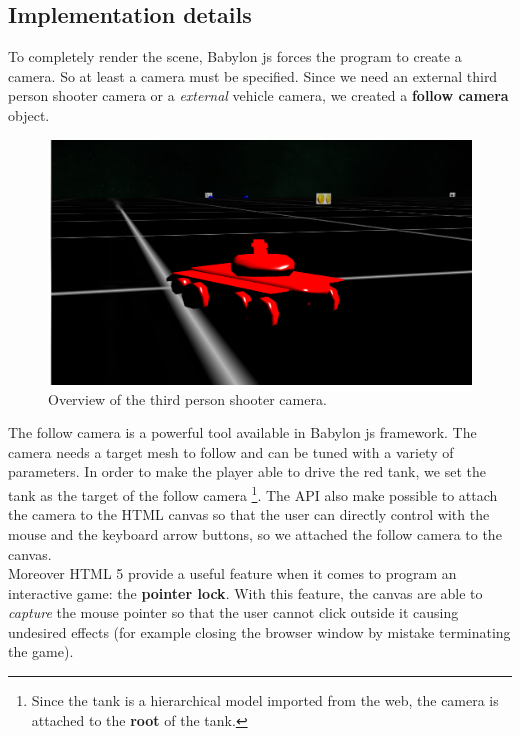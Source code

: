 \documentclass[14pt]{article}
\begin{document}
\subsection{Implementation details}
To completely render the scene, Babylon js forces the program to create a camera. So at least a camera must be specified. Since we need an external third person shooter camera or a \textit{external} vehicle camera, we created a \textbf{follow camera} object.
\begin{figure}[H]
\includegraphics[width = 12cm]{images/thirdPerson.png}
\caption{Overview of the third person shooter camera.}
\label{img:thirdPerson}
\end{figure}
The follow camera is a powerful tool available in Babylon js framework. The camera needs a target mesh to follow and can be tuned with a variety of parameters. In order to make the player able to drive the red tank, we set the tank as the target of the follow camera \footnote{Since the tank is a hierarchical model imported from the web, the camera is attached to the \textbf{root} of the tank.}. The API also make possible to attach the camera to the HTML canvas so that the user can directly control with the mouse and the keyboard arrow buttons, so we attached the follow camera to the canvas. \\
Moreover HTML 5 provide a useful feature when it comes to program an interactive game: the \textbf{pointer lock}. With this feature, the canvas are able to \textit{capture} the mouse pointer so that the user cannot click outside it causing undesired effects (for example closing the browser window by mistake terminating the game).
\end{document}
